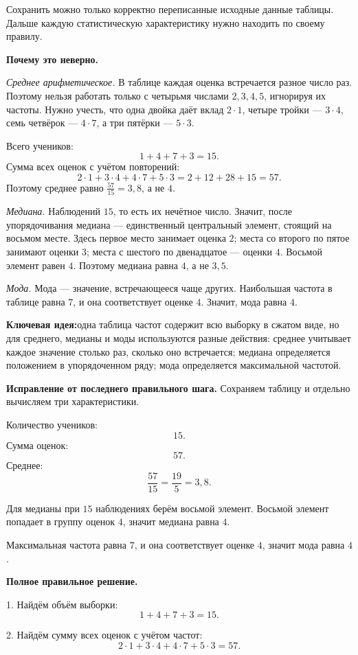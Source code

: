 \documentclass[12pt,a4paper]{article}
\newcommand{\keyidea}{\textcolor{blue!60!black}{\textbf{Ключевая идея:}}}
\begin{document}
Сохранить можно только корректно переписанные исходные данные таблицы. Дальше каждую статистическую характеристику нужно находить по своему правилу.

\textbf{Почему это неверно.}

\emph{Среднее арифметическое.} В таблице каждая оценка встречается разное число раз. Поэтому нельзя работать только с четырьмя числами $2,3,4,5$, игнорируя их частоты. Нужно учесть, что одна двойка даёт вклад $2\cdot1$, четыре тройки --- $3\cdot4$, семь четвёрок --- $4\cdot7$, а три пятёрки --- $5\cdot3$.

Всего учеников:
\[
1+4+7+3=15.
\]
Сумма всех оценок с учётом повторений:
\[
2\cdot1+3\cdot4+4\cdot7+5\cdot3=2+12+28+15=57.
\]
Поэтому среднее равно $\frac{57}{15}=3{,}8$, а не $4$.

\emph{Медиана.} Наблюдений $15$, то есть их нечётное число. Значит, после упорядочивания медиана --- единственный центральный элемент, стоящий на восьмом месте. Здесь первое место занимает оценка $2$; места со второго по пятое занимают оценки $3$; места с шестого по двенадцатое --- оценки $4$. Восьмой элемент равен $4$. Поэтому медиана равна $4$, а не $3{,}5$.

\emph{Мода.} Мода --- значение, встречающееся чаще других. Наибольшая частота в таблице равна $7$, и она соответствует оценке $4$. Значит, мода равна $4$.

\keyidea одна таблица частот содержит всю выборку в сжатом виде, но для среднего, медианы и моды используются разные действия: среднее учитывает каждое значение столько раз, сколько оно встречается; медиана определяется положением в упорядоченном ряду; мода определяется максимальной частотой.

\textbf{Исправление от последнего правильного шага.}
Сохраняем таблицу и отдельно вычисляем три характеристики.

Количество учеников:
\[
15.
\]
Сумма оценок:
\[
57.
\]
Среднее:
\[
\frac{57}{15}=\frac{19}{5}=3{,}8.
\]

Для медианы при $15$ наблюдениях берём восьмой элемент. Восьмой элемент попадает в группу оценок $4$, значит медиана равна $4$.

Максимальная частота равна $7$, и она соответствует оценке $4$, значит мода равна $4$.

\textbf{Полное правильное решение.}

1. Найдём объём выборки:
\[
1+4+7+3=15.
\]

2. Найдём сумму всех оценок с учётом частот:
\[
2\cdot1+3\cdot4+4\cdot7+5\cdot3=57.
\]
\end{document}
